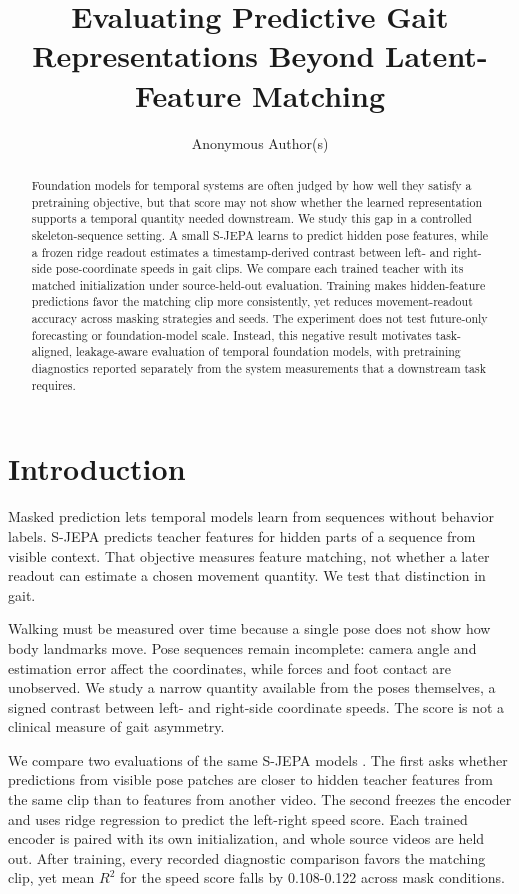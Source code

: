 \documentclass{article}
\title{Evaluating Predictive Gait Representations Beyond Latent-Feature Matching}
\author{Anonymous Author(s)}
\begin{document}
\maketitle
\begin{abstract}
Foundation models for temporal systems are often judged by how well they
satisfy a pretraining objective, but that score may not show whether the
learned representation supports a temporal quantity needed downstream.
We study this gap in a controlled skeleton-sequence setting. A small
S-JEPA learns to predict hidden pose features, while a frozen ridge
readout estimates a timestamp-derived contrast between left- and
right-side pose-coordinate speeds in gait clips. We compare each trained
teacher with its matched initialization under source-held-out
evaluation. Training makes hidden-feature predictions favor the matching
clip more consistently, yet reduces movement-readout accuracy across
masking strategies and seeds. The experiment does not test future-only
forecasting or foundation-model scale. Instead, this negative result
motivates task-aligned, leakage-aware evaluation of temporal foundation
models, with pretraining diagnostics reported separately from the system
measurements that a downstream task requires.
\end{abstract}
\section{Introduction}\label{introduction}

Masked prediction lets temporal models learn from sequences without
behavior labels. S-JEPA predicts teacher features for hidden parts of a
sequence from visible context. That objective measures feature matching,
not whether a later readout can estimate a chosen movement quantity. We
test that distinction in gait.

Walking must be measured over time because a single pose does not show
how body landmarks move. Pose sequences remain incomplete: camera angle
and estimation error affect the coordinates, while forces and foot
contact are unobserved. We study a narrow quantity available from the
poses themselves, a signed contrast between left- and right-side
coordinate speeds. The score is not a clinical measure of gait
asymmetry.

We compare two evaluations of the same S-JEPA models \citep{sjepa}. The
first asks whether predictions from visible pose patches are closer to
hidden teacher features from the same clip than to features from another
video. The second freezes the encoder and uses ridge regression to
predict the left-right speed score. Each trained encoder is paired with
its own initialization, and whole source videos are held out. After
training, every recorded diagnostic comparison favors the matching clip,
yet mean \(R^2\) for the speed score falls by 0.108-0.122 across mask
conditions.
\end{document}

